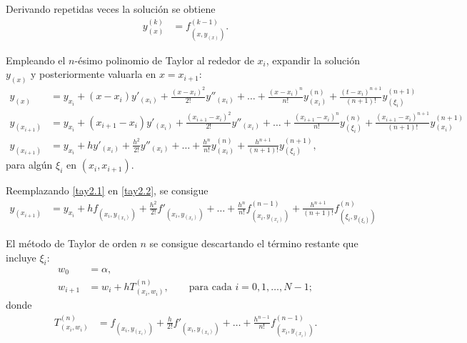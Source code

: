 \documentclass[english,spanish,Ce-table,Ce-theorem]{CabesHW}
\begin{document}
Derivando repetidas veces la solución se obtiene
\begin{align*}
\label{tay2.1}
    y^{(k)}_{(x)} &= f^{(k-1)}_{(x, y_{(x)})}. \tag{2.1}
\end{align*}

Empleando el $n$-ésimo polinomio de Taylor al rededor de $x_i$, expandir la solución $y_{(x)}$ y posteriormente valuarla en $x= x_{i+1}$:
\begin{align*}
    y_{(x)} &= y_{x_i} + (x-x_i)y'_{(x_i)} + \frac{(x-x_i)^2}{2!}y''_{(x_i)} + \ldots + \frac{(x-x_i)^{n}}{n!}y^{(n)}_{(x_i)} + \frac{(t-x_i)^{n+1}}{(n+1)!}y^{(n+1)}_{(\xi_i)}\\
    y_{(x_{i+1})} &= y_{x_i} + (x_{i+1}-x_i)y'_{(x_i)} + \frac{(x_{i+1}-x_i)^2}{2!}y''_{(x_i)} + \ldots + \frac{(x_{i+1}-x_i)^{n}}{n!}y^{(n)}_{(\xi_i)} + \frac{(x_{i+1}-x_i)^{n+1}}{(n+1)!}y^{(n+1)}_{(x_i)}\\
\label{tay2.2}
    y_{(x_{i+1})} &= y_{x_i} + hy'_{(x_i)} + \frac{h^2}{2!}y''_{(x_i)} + \ldots + \frac{h^{n}}{n!}y^{(n)}_{(x_i)} + \frac{h^{n+1}}{(n+1)!}y^{(n+1)}_{(\xi_i)}, \tag{2.2}
\end{align*}
para algún $\xi_i$ en $(x_i, x_{i+1})$.

Reemplazando \eqref{tay2.1} en \eqref{tay2.2}, se consigue
\begin{align*}
    y_{(x_{i+1})} &= y_{x_i} + hf_{(x_i, y_{(x_i)})} + \frac{h^2}{2!}f'_{(x_i, y_{(x_i)})} + \ldots + \frac{h^{n}}{n!}f^{(n-1)}_{(x_i, y_{(x_i)})} + \frac{h^{n+1}}{(n+1)!}f^{(n)}_{(\xi_i, y_{(\xi_i)})}
\end{align*}

El método de Taylor de orden $n$ se consigue descartando el término restante que incluye $\xi_i$:
\begin{align*}
    w_0 &= \alpha,\\
    w_{i+1} &= w_i + hT^{(n)}_{(x_i, w_i)}, \qquad \text{para cada $i = 0, 1, \ldots, N-1$};
\end{align*}
donde
\begin{align*}
    T^{(n)}_{(x_i, w_i)} &= f_{(x_i, y_{(x_i)})} + \frac{h}{2!}f'_{(x_i, y_{(x_i)})} + \ldots + \frac{h^{n-1}}{n!}f^{(n-1)}_{(x_i, y_{(x_i)})} .
\end{align*}
\end{document}
